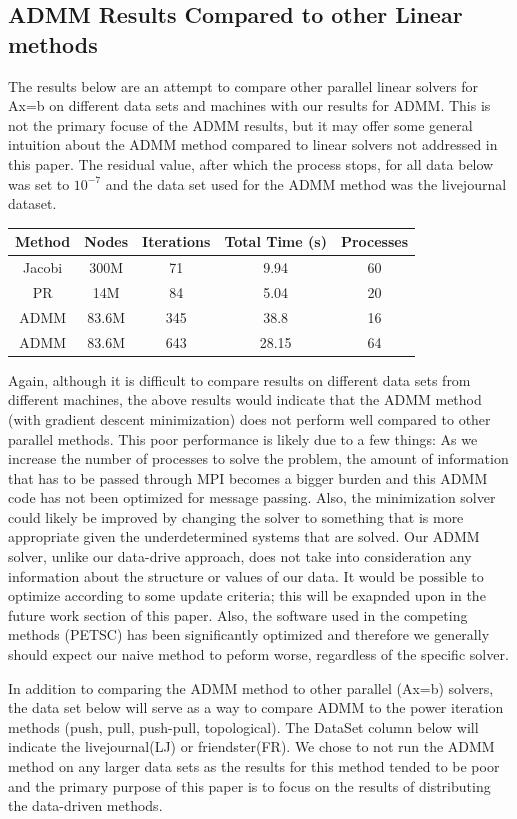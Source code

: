 \documentclass[letterpaper,11pt,onecolumn]{article}
\begin{document}
\subsection{ADMM Results Compared to other Linear methods}
The results below are an attempt to compare other parallel linear solvers for Ax=b  on different data sets and machines with our results for ADMM. This is not the primary focuse of the ADMM results, but it may offer some general intuition about the ADMM method compared to linear solvers not addressed in this paper.
The residual value, after which the process stops, for all data below was set to $10^{-7}$ and the data set used for the ADMM method was the livejournal dataset.
\begin{center}
  \begin{tabular}{c|c|c|c|c}
	\hline
	Method & Nodes & Iterations & Total Time (s) & Processes \\
	\hline\hline
	Jacobi & 300M & 71 & 9.94 & 60\\
	PR & 14M & 84  & 5.04 & 20 \\ 
	ADMM & 83.6M & 345 & 38.8  & 16 \\
	ADMM & 83.6M & 643 & 28.15 & 64 \\
  \end{tabular}
\end{center}

Again, although it is difficult to compare results on different data sets from different machines, the above results would indicate that the ADMM method (with gradient descent minimization) does not perform well compared to other parallel methods. This poor performance is likely due to a few things: As we increase the number of processes to solve the problem, the amount of information that has to be passed through MPI becomes a bigger burden and this ADMM code has not been optimized for message passing. Also, the minimization solver could likely be improved by changing the solver to something that is more appropriate given the underdetermined systems that are solved. Our ADMM solver, unlike our data-drive approach, does not take into consideration any information about the structure or values of our data. It would be possible to optimize according to some update criteria; this will be exapnded upon in the future work section of this paper. Also, the software used in the competing methods (PETSC) has been significantly optimized and therefore we generally should expect our naive method to peform worse, regardless of the specific solver.

In addition to comparing the ADMM method to other parallel (Ax=b) solvers, the data set below will serve as a way to compare ADMM to the power iteration methods (push, pull, push-pull, topological). The DataSet column below will indicate the livejournal(LJ) or friendster(FR). We chose to not run the ADMM method on any larger data sets as the results for this method tended to be poor and the primary purpose of this paper is to focus on the results of distributing the data-driven methods.
\end{document}

